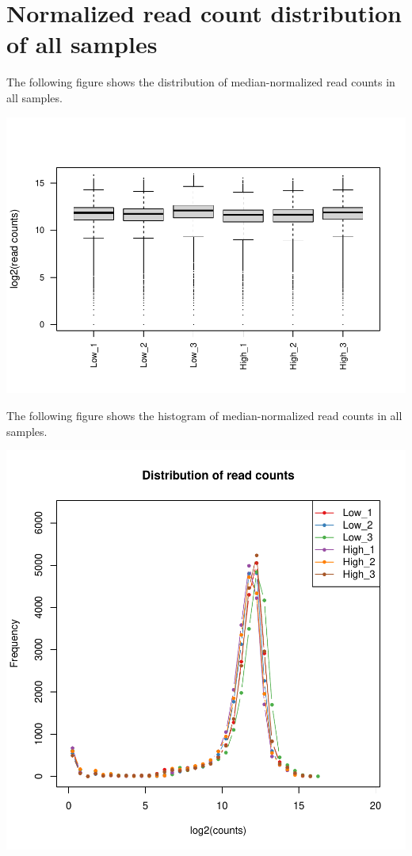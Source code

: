 \documentclass{article}
\begin{document}
\newpage\section{Normalized read count distribution of all samples}
The following figure shows the distribution of median-normalized read counts in all samples.


\includegraphics{all_countsummary-005}

The following figure shows the histogram of median-normalized read counts in all samples.


\includegraphics{all_countsummary-006}
\end{document}
